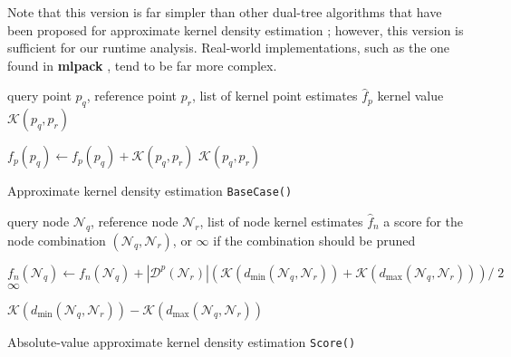 Note that this version is far simpler than other dual-tree algorithms that have
been proposed for approximate kernel density estimation \citep[see, for
instance][]{gray2003nonparametric}; however, this version is sufficient for our
runtime analysis.  Real-world implementations, such as the one found in
\textbf{mlpack} \citep{mlpack2013}, tend to be far more complex.

\begin{algorithm}[tb]
  \begin{algorithmic}[1]
     query point $p_q$, reference point $p_r$, list of
  kernel point estimates $\hat{f}_p$
     kernel value $\mathcal{K}(p_q, p_r)$

    \medskip
    \STATE $f_p(p_q) \gets f_p(p_q) + \mathcal{K}(p_q, p_r)$
\label{alg:kde-bc-update}
    \RETURN $\mathcal{K}(p_q, p_r)$
  \end{algorithmic}

  \caption{Approximate kernel density estimation \texttt{BaseCase()}}
  \label{alg:kde_base_case}
\end{algorithm}

\begin{algorithm}[tb]
  \begin{algorithmic}[1]
     query node $\mathscr{N}_q$, reference node
$\mathscr{N}_r$, list of node kernel estimates $\hat{f}_n$
     a score for the node combination $(\mathscr{N}_q,
\mathscr{N}_r)$, or $\infty$ if the combination should be pruned

    \medskip

\label{alg:ava-kde-prune}
      \STATE $f_n(\mathscr{N}_q) \gets f_n(\mathscr{N}_q) + |
\mathscr{D}^p(\mathscr{N}_r) | \left(\mathcal{K}(d_{\min}(\mathscr{N}_q,
\mathscr{N}_r)) + \mathcal{K}(d_{\max}(\mathscr{N}_q, \mathscr{N}_r))\right)
/\;2$ \label{alg:ava-kde-update}
      \RETURN $\infty$
    \ENDIF

    \RETURN $\mathcal{K}(d_{\min}(\mathscr{N}_q, \mathscr{N}_r)) -
\mathcal{K}(d_{\max}(\mathscr{N}_q, \mathscr{N}_r))$
  \end{algorithmic}

  \caption{Absolute-value approximate kernel density estimation
\texttt{Score()}}
  \label{alg:kde_score}
\end{algorithm}

